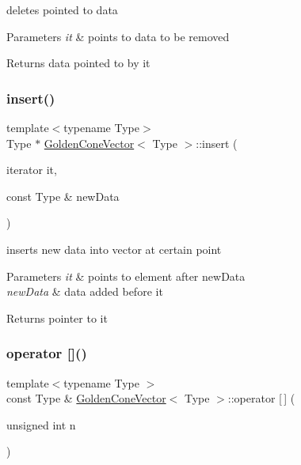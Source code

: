 deletes pointed to data 


\begin{DoxyParams}{Parameters}
{\em it} & points to data to be removed \\
\hline
\end{DoxyParams}
\begin{DoxyReturn}{Returns}
data pointed to by it 
\end{DoxyReturn}
\mbox{\label{class_golden_cone_vector_a88d8c250877cea1bbec12ec6419a32d8}} 
\subsubsection{\texorpdfstring{insert()}{insert()}}
{\footnotesize\ttfamily template$<$typename Type$>$ \\
Type $\ast$ \mbox{\hyperlink{class_golden_cone_vector}{Golden\+Cone\+Vector}}$<$ Type $>$\+::insert (\begin{DoxyParamCaption}\item[{iterator}]{it,  }\item[{const Type \&}]{new\+Data }\end{DoxyParamCaption})}



inserts new data into vector at certain point 


\begin{DoxyParams}{Parameters}
{\em it} & points to element after new\+Data \\
\hline
{\em new\+Data} & data added before it \\
\hline
\end{DoxyParams}
\begin{DoxyReturn}{Returns}
pointer to it 
\end{DoxyReturn}
\mbox{\label{class_golden_cone_vector_ada3090319161478b8c9bb3ca35175774}} 
\subsubsection{\texorpdfstring{operator []()}{operator []()}}
{\footnotesize\ttfamily template$<$typename Type $>$ \\
const Type \& \mbox{\hyperlink{class_golden_cone_vector}{Golden\+Cone\+Vector}}$<$ Type $>$\+::operator \mbox{[}$\,$\mbox{]} (\begin{DoxyParamCaption}\item[{unsigned int}]{n }\end{DoxyParamCaption})}



